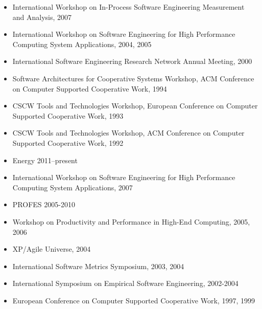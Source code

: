 \documentclass[11pt,letterpaper,sans]{moderncv} %
\begin{document}
\begin{itemize}
\item International Workshop on In-Process Software Engineering Measurement and Analysis, 2007
\item International Workshop on Software Engineering for High Performance Computing
  System Applications, 2004, 2005
\item International Software Engineering Research Network Annual Meeting, 2000
\item Software Architectures for Cooperative Systems Workshop, ACM Conference on
  Computer Supported Cooperative Work, 1994
\item CSCW Tools and Technologies Workshop, European Conference on Computer Supported
  Cooperative Work, 1993 
\item CSCW Tools and Technologies Workshop, ACM Conference on Computer Supported Cooperative Work, 1992 
\end{itemize}

\begin{itemize}
\item Energy 2011--present
\item International Workshop on Software Engineering for High Performance Computing
  System Applications, 2007
\item PROFES 2005-2010
\item Workshop on Productivity and Performance in High-End Computing, 2005, 2006
\item XP/Agile Universe, 2004
\item International Software Metrics Symposium, 2003, 2004
\item International Symposium on Empirical Software Engineering, 2002-2004
\item European Conference on Computer Supported Cooperative Work, 1997, 1999
\end{itemize}







\end{document}
